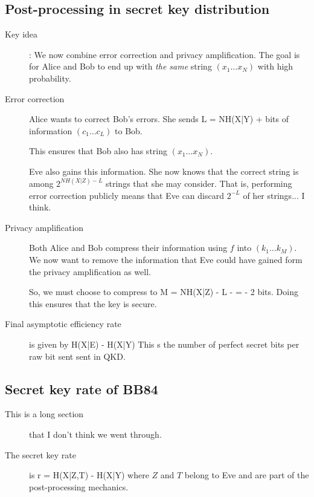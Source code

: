 \subsection{Post-processing in secret key distribution}
\begin{description}
\item[Key idea]: We now combine error correction and privacy amplification. The goal is for Alice and Bob to end up with \emph{the same} string $(x_1\ldots x_N)$ with high probability. 

\item[Error correction] Alice wants to correct Bob's errors. She sends
\beq
L = NH(X|Y) + 
\eeq
bits of information $(c_1 \ldots c_L)$ to Bob. 

This ensures that Bob also has string $(x_1 \ldots x_N)$. 

Eve also gains this information. She now knows that the correct string is among $2^{NH(X|Z) - L}$ strings that she may consider. That is, performing error correction publicly means that Eve can discard $2^{-L}$ of her strings... I think. 


\item[Privacy amplification] Both Alice and Bob compress their information using $f$ into $(k_1 \ldots k_M)$. We now want to remove the information that Eve could have gained form the privacy amplification as well. 

So, we must choose to compress to 
\beq
M = NH(X|Z) - L -  = - 2 
\eeq
bits. Doing this ensures that the key is secure.

\item[Final asymptotic efficiency rate] is given by 
\beq
H(X|E) - H(X|Y)
\eeq
This s the number of perfect secret bits per raw bit sent sent in QKD. 

\end{description}

\subsection{Secret key rate of BB84}
\begin{description}

\item[This is a long section] that I don't think we went through. 


\item[The secret key rate] is
\beq
r = H(X|Z,T) - H(X|Y)
\eeq
where $Z$ and $T$ belong to Eve and are part of the post-processing mechanics. 


\end{description}


